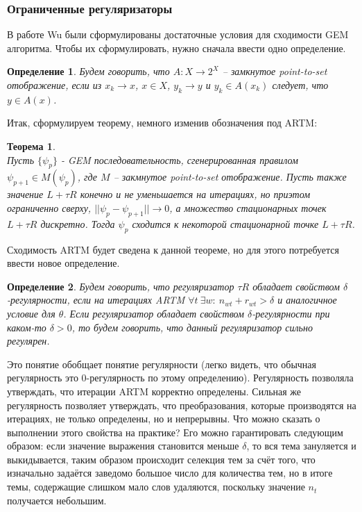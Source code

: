 \documentclass[12pt]{article}
\newtheorem{definition}{Определение}[section]
\newtheorem{theorem}{Теорема}
\begin{document}
	\subsubsection{Ограниченные регуляризаторы}
	 В работе Wu \cite{wuem} были сформулированы достаточные условия для сходимости GEM алгоритма. Чтобы их сформулировать, нужно сначала ввести одно определение.
	\begin{definition}
	Будем говорить, что $A\colon X \to 2^X$ -- замкнутое point-to-set отображение, если из $x_k \to x$, $x \in X$, $y_k \to y$ и $y_k \in A(x_k)$ следует, что $y \in A(x)$.
	\end{definition}
	Итак, сформулируем теорему, немного изменив обозначения под ARTM:
	\begin{theorem} \label{theorem_wu} \ \\
	Пусть $\{\psi_p\}$ - GEM последовательность, сгенерированная правилом $\psi_{p+1} \in M(\psi_p)$, где $M$ -- закмнутое point-to-set отображение. Пусть также значение $L + \tau R$ конечно и не уменьшается на итерациях, но приэтом ограниченно сверху, $|| \psi_p - \psi_{p+1}|| \to 0$, а множество стационарных точек $L + \tau R$ дискретно. Тогда $\psi_p$ сходится к некоторой стационарной точке $L + \tau R$.
	\end{theorem}
	Сходимость ARTM будет сведена к данной теореме, но для этого потребуется ввести новое определение.
	\begin{definition}
	Будем говорить, что регуляризатор $\tau R$ обладает свойством $\delta$-регулярности, если на итерациях ARTM $\forall t~\exists w \colon~n_{wt} + r_{wt} > \delta$ и аналогичное условие для $\theta$. Если регуляризатор  обладает свойством $\delta$-регулярности при каком-то $\delta > 0$, то будем говорить, что данный регуляризатор сильно регулярен.
	\end{definition}
	Это понятие обобщает понятие регулярности (легко видеть, что обычная регулярность это 0-регулярность по этому определению). Регулярность позволяла утверждать, что итерации ARTM корректно определены. Сильная же регулярность позволяет утверждать, что преобразования, которые производятся на итерациях, не только определены, но и непрерывны. Что можно сказать о выполнении этого свойства на практике? Его можно гарантировать следующим образом: если значение выражения становится меньше $\delta$, то вся тема зануляется  и выкидывается, таким образом происходит селекция тем за счёт того, что изначально задаётся заведомо большое число для количества тем, но в итоге темы, содержащие слишком мало слов удаляются, поскольку значение $n_t$ получается небольшим.
\end{document}
